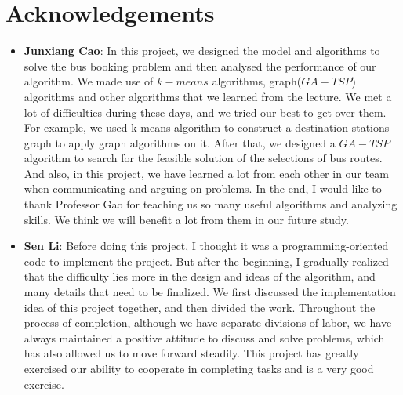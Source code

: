 \documentclass{llncs}
\begin{document}
\section*{Acknowledgements}
\begin{itemize}
	\item \textbf{Junxiang Cao}: In this project, we designed the model and algorithms to solve the bus booking problem and then analysed the performance of our algorithm. We made use of $k-means$ algorithms, graph($GA-TSP$) algorithms and other algorithms that we learned from the lecture. We met a lot of difficulties during these days, and we tried our best to get over them. For example, we used k-means algorithm to construct a destination stations graph to apply graph algorithms on it. After that, we designed a $GA-TSP$ algorithm to search for the feasible solution of the selections of bus routes. And also, in this project, we have learned a lot from each other in our team when communicating and arguing on problems. In the end, I would like to thank Professor Gao for teaching us so many useful algorithms and analyzing skills. We think we will benefit a lot from them in our future study.
	
	\vspace{1em}
	
	\item \textbf{Sen Li}: Before doing this project, I thought it was a programming-oriented code to implement the project. But after the beginning, I gradually realized that the difficulty lies more in the design and ideas of the algorithm, and many details that need to be finalized. We first discussed the implementation idea of this project together, and then divided the work. Throughout the process of completion, although we have separate divisions of labor, we have always maintained a positive attitude to discuss and solve problems, which has also allowed us to move forward steadily. This project has greatly exercised our ability to cooperate in completing tasks and is a very good exercise.
	
	\vspace{1em}
	

\end{itemize}
\end{document}
